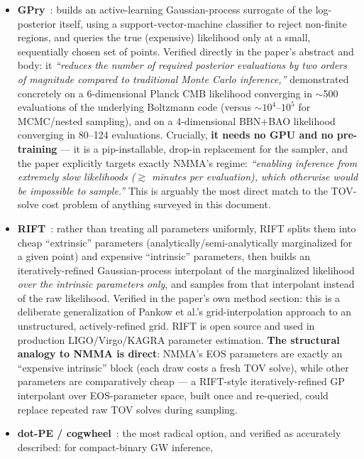 \documentclass[11pt]{article}
\begin{document}
\begin{itemize}[leftmargin=1.4em]
\item \textbf{GPry}~\cite{Gammal:2022eob}: builds an active-learning Gaussian-process
surrogate of the log-posterior itself, using a support-vector-machine classifier to reject
non-finite regions, and queries the true (expensive) likelihood only at a small, sequentially
chosen set of points. Verified directly in the paper's abstract and body: it \emph{``reduces
the number of required posterior evaluations by two orders of magnitude compared to
traditional Monte Carlo inference,''} demonstrated concretely on a 6-dimensional Planck CMB
likelihood converging in $\sim$500 evaluations of the underlying Boltzmann code (versus
$\sim\!10^4$--$10^5$ for MCMC/nested sampling), and on a 4-dimensional BBN+BAO likelihood
converging in 80--124 evaluations. Crucially, \textbf{it needs no GPU and no pre-training}
--- it is a pip-installable, drop-in replacement for the sampler, and the paper explicitly
targets exactly NMMA's regime: \emph{``enabling inference from extremely slow likelihoods
($\gtrsim$ minutes per evaluation), which otherwise would be impossible to sample.''} This is
arguably the most direct match to the TOV-solve cost problem of anything surveyed in this
document.
\item \textbf{RIFT}~\cite{Lange:2018pyp}: rather than treating all parameters uniformly,
RIFT splits them into cheap ``extrinsic'' parameters (analytically/semi-analytically
marginalized for a given point) and expensive ``intrinsic'' parameters, then builds an
iteratively-refined Gaussian-process interpolant of the marginalized likelihood
\emph{over the intrinsic parameters only}, and samples from that interpolant instead of the
raw likelihood. Verified in the paper's own method section: this is a deliberate
generalization of Pankow et al.'s grid-interpolation approach to an unstructured,
actively-refined grid. RIFT is open source and used in production LIGO/Virgo/KAGRA parameter
estimation. \textbf{The structural analogy to NMMA is direct}: NMMA's EOS parameters are
exactly an ``expensive intrinsic'' block (each draw costs a fresh TOV solve), while other
parameters are comparatively cheap --- a RIFT-style iteratively-refined GP interpolant over
EOS-parameter space, built once and re-queried, could replace repeated raw TOV solves during
sampling.
\item \textbf{dot-PE / cogwheel}~\cite{Mushkin:2025yks,Roulet:2022kot,Roulet:2024hwz}: the
most radical option, and verified as accurately described: for compact-binary GW inference,

\end{itemize}
\end{document}
